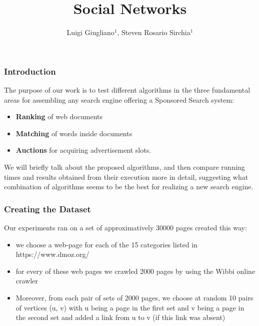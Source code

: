 \documentclass{beamer}
\title{Social Networks}
\author{Luigi Giugliano$^1$, Steven Rosario Sirchia$^1$}
\institute{$^1$Università degli studi di Salerno}
\begin{document}
\begin{frame}
   \maketitle
\end{frame}

\begin{frame}
\frametitle{Introduction}
The purpose of our work is to test different algorithms in the three fundamental areas for assembling any search engine offering a Sponsored Search system:
\begin{itemize}
\item \textbf{Ranking} of web documents
\item \textbf{Matching} of words inside documents
\item \textbf{Auctions} for acquiring advertisement slots.
\end{itemize}
We will briefly talk about the proposed algorithms, and then compare running times and results obtained from their execution more in detail, suggesting what combination of algorithms seems to be the best for realizing a new search engine.
\end{frame}

\begin{frame}
\frametitle{Creating the Dataset}
Our experiments ran on a set of approximatively 30000 pages created this way:
\begin{itemize}
	\item we choose a web-page for each of the 15 categories listed in https://www.dmoz.org/
	\item for every of these web pages we crawled 2000 pages by using the Wibbi online crawler
	\item Moreover, from each pair of sets of 2000 pages, we choose at random 10 pairs of vertices (u, v) with u being a page in the first set and v being a page in the second set and added a link from u to v (if this link was absent)
\end{itemize}
\end{frame}
\end{document}
